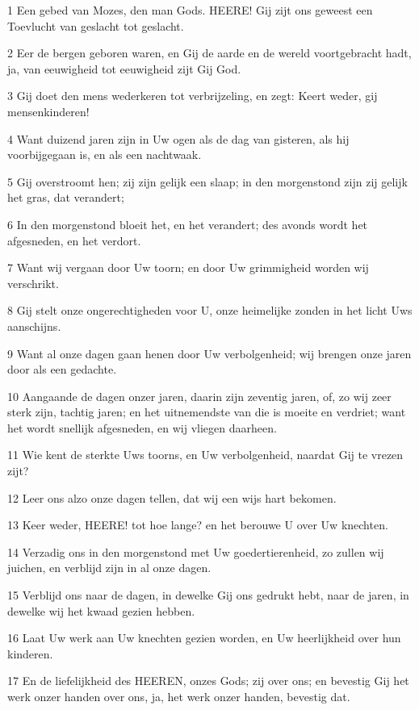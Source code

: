 \par 1 Een gebed van Mozes, den man Gods. HEERE! Gij zijt ons geweest een Toevlucht van geslacht tot geslacht.
\par 2 Eer de bergen geboren waren, en Gij de aarde en de wereld voortgebracht hadt, ja, van eeuwigheid tot eeuwigheid zijt Gij God.
\par 3 Gij doet den mens wederkeren tot verbrijzeling, en zegt: Keert weder, gij mensenkinderen!
\par 4 Want duizend jaren zijn in Uw ogen als de dag van gisteren, als hij voorbijgegaan is, en als een nachtwaak.
\par 5 Gij overstroomt hen; zij zijn gelijk een slaap; in den morgenstond zijn zij gelijk het gras, dat verandert;
\par 6 In den morgenstond bloeit het, en het verandert; des avonds wordt het afgesneden, en het verdort.
\par 7 Want wij vergaan door Uw toorn; en door Uw grimmigheid worden wij verschrikt.
\par 8 Gij stelt onze ongerechtigheden voor U, onze heimelijke zonden in het licht Uws aanschijns.
\par 9 Want al onze dagen gaan henen door Uw verbolgenheid; wij brengen onze jaren door als een gedachte.
\par 10 Aangaande de dagen onzer jaren, daarin zijn zeventig jaren, of, zo wij zeer sterk zijn, tachtig jaren; en het uitnemendste van die is moeite en verdriet; want het wordt snellijk afgesneden, en wij vliegen daarheen.
\par 11 Wie kent de sterkte Uws toorns, en Uw verbolgenheid, naardat Gij te vrezen zijt?
\par 12 Leer ons alzo onze dagen tellen, dat wij een wijs hart bekomen.
\par 13 Keer weder, HEERE! tot hoe lange? en het berouwe U over Uw knechten.
\par 14 Verzadig ons in den morgenstond met Uw goedertierenheid, zo zullen wij juichen, en verblijd zijn in al onze dagen.
\par 15 Verblijd ons naar de dagen, in dewelke Gij ons gedrukt hebt, naar de jaren, in dewelke wij het kwaad gezien hebben.
\par 16 Laat Uw werk aan Uw knechten gezien worden, en Uw heerlijkheid over hun kinderen.
\par 17 En de liefelijkheid des HEEREN, onzes Gods; zij over ons; en bevestig Gij het werk onzer handen over ons, ja, het werk onzer handen, bevestig dat.

